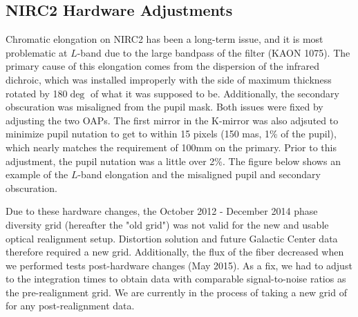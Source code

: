 \subsection{NIRC2 Hardware Adjustments}
\label{sec:instrument_hardware}
Chromatic elongation on NIRC2 has been a long-term issue, and it is most problematic at $L$-band due to the large bandpass of the filter (KAON 1075). The primary cause of this elongation comes from the dispersion of the infrared dichroic, which was installed improperly with the side of maximum thickness rotated by 180$\deg$ of what it was supposed to be. Additionally, the secondary obscuration was misaligned from the pupil mask. Both issues were fixed by adjusting the two OAPs. The first mirror in the K-mirror was also adjsuted to minimize pupil nutation to get to within 15 pixels (150 mas, 1\% of the pupil), which nearly matches the requirement of 100mm on the primary. Prior to this adjustment, the pupil nutation was a little over 2\%. The figure below shows an example of the $L$-band elongation and the misaligned pupil and secondary obscuration.

Due to these hardware changes, the October 2012 - December 2014 phase diversity grid (hereafter the "old grid") was not valid for the new and usable optical realignment setup. Distortion solution and future Galactic Center data therefore required a new grid. Additionally, the flux of the fiber decreased when we performed tests post-hardware changes (May 2015). As a fix, we had to adjust to the integration times to obtain data with comparable signal-to-noise ratios as the pre-realignment grid. We are currently in the process of taking a new grid of for any post-realignment data.

    
    
    
  
  
  
  
  